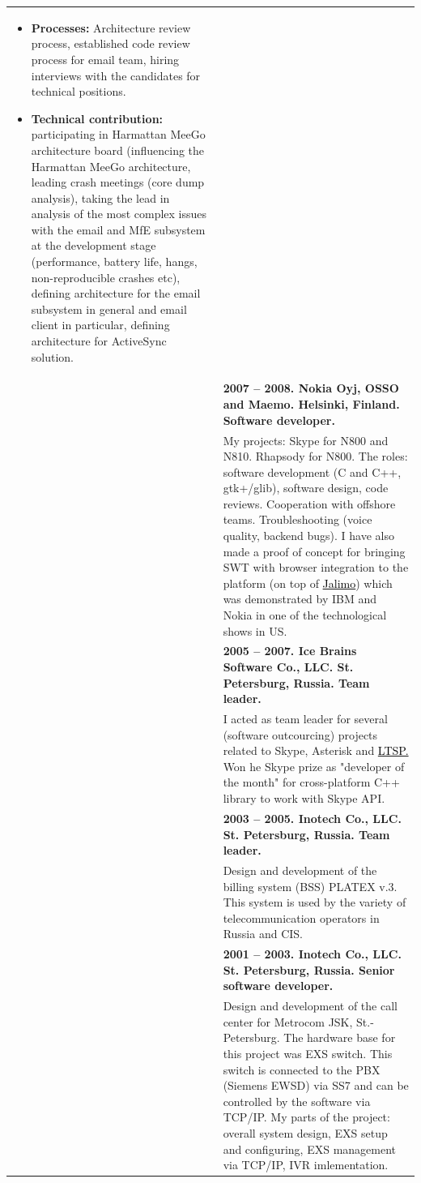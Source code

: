 \documentclass[a4paper]{article}
\newcommand{\myhref}[2]{\href{#1}{\textcolor{black}{#2}}}
\begin{document}
\begin{tabular}{lp{12cm}}
\begin{itemize}
\item \textbf{Processes:} Architecture review process, established code review process for email team, hiring interviews with the candidates for technical positions.
\item \textbf{Technical contribution:} participating in Harmattan MeeGo architecture board (influencing the Harmattan
MeeGo architecture, leading crash meetings (core dump analysis), taking the lead in analysis of the most complex
issues with the email and MfE subsystem at the development stage (performance, battery life, hangs, non-reproducible crashes etc), defining architecture for the email subsystem in
general and email client in particular, defining architecture for ActiveSync solution.
\end{itemize}\\[-.25cm]
& \textbf{2007 -- 2008. Nokia Oyj, OSSO and Maemo. Helsinki, Finland. Software developer.}\\
& My projects: Skype for N800 and N810. Rhapsody for N800. The roles: software development (C and C++, gtk+/glib),
software design, code reviews.  Cooperation with offshore teams. Troubleshooting (voice quality, backend bugs).
I have also made a proof of concept for bringing SWT with browser integration to the platform (on top of
\myhref{https://evolvis.org/plugins/mediawiki/wiki/jalimo/index.php/Jalimo}{Jalimo}) which was demonstrated by IBM and Nokia
in one of the technological shows in US.\\
& \textbf{2005 -- 2007. Ice Brains Software Co., LLC. St. Petersburg, Russia.  Team leader.}\\
& I acted as team leader for several (software outcourcing) projects related to Skype, Asterisk and \myhref{http://www.ltsp.org/}{LTSP.} Won he Skype prize as "developer of the month" for cross-platform C++ library to work with Skype API.\\
& \textbf{2003 -- 2005. Inotech Co., LLC. St. Petersburg, Russia. Team leader.}\\
& Design and development of the billing system (BSS) PLATEX v.3.  This system is used by the variety of telecommunication operators in Russia and CIS.\\
& \textbf{2001 -- 2003. Inotech Co., LLC. St. Petersburg, Russia.  Senior software developer.}\\
& Design and development of the call center for Metrocom JSK, St.-Petersburg.  
The hardware base for this project was EXS switch.  This switch is connected to the PBX (Siemens EWSD) via SS7 and can be controlled
by the software via TCP/IP. My parts of the project: overall system design, EXS setup and configuring, EXS management via TCP/IP, IVR imlementation.\\
\end{tabular}
\end{document}
